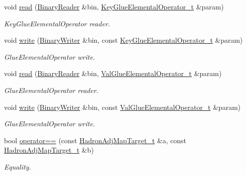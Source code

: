 \begin{DoxyCompactItemize}
void \mbox{\hyperlink{namespaceHadron_a008c27a4777be30324acc6271e059d2e}{read}} (\mbox{\hyperlink{classADATIO_1_1BinaryReader}{Binary\+Reader}} \&bin, \mbox{\hyperlink{structHadron_1_1KeyGlueElementalOperator__t}{Key\+Glue\+Elemental\+Operator\+\_\+t}} \&param)
\begin{DoxyCompactList}\small\item\em Key\+Glue\+Elemental\+Operator reader. \end{DoxyCompactList}\item 
void \mbox{\hyperlink{namespaceHadron_a91e2c5264aeab6dfb2be779cf7140626}{write}} (\mbox{\hyperlink{classADATIO_1_1BinaryWriter}{Binary\+Writer}} \&bin, const \mbox{\hyperlink{structHadron_1_1KeyGlueElementalOperator__t}{Key\+Glue\+Elemental\+Operator\+\_\+t}} \&param)
\begin{DoxyCompactList}\small\item\em Glue\+Elemental\+Operator write. \end{DoxyCompactList}\item 
void \mbox{\hyperlink{namespaceHadron_a9991ac06f4136479286a214307cd17dc}{read}} (\mbox{\hyperlink{classADATIO_1_1BinaryReader}{Binary\+Reader}} \&bin, \mbox{\hyperlink{structHadron_1_1ValGlueElementalOperator__t}{Val\+Glue\+Elemental\+Operator\+\_\+t}} \&param)
\begin{DoxyCompactList}\small\item\em Glue\+Elemental\+Operator reader. \end{DoxyCompactList}\item 
void \mbox{\hyperlink{namespaceHadron_aee7b5924c79af024abb8c3d99f7e8b34}{write}} (\mbox{\hyperlink{classADATIO_1_1BinaryWriter}{Binary\+Writer}} \&bin, const \mbox{\hyperlink{structHadron_1_1ValGlueElementalOperator__t}{Val\+Glue\+Elemental\+Operator\+\_\+t}} \&param)
\begin{DoxyCompactList}\small\item\em Glue\+Elemental\+Operator write. \end{DoxyCompactList}\item 
bool \mbox{\hyperlink{namespaceHadron_a89bb389d765cff67405fdb2d27b9b289}{operator==}} (const \mbox{\hyperlink{structHadron_1_1HadronAdjMapTarget__t}{Hadron\+Adj\+Map\+Target\+\_\+t}} \&a, const \mbox{\hyperlink{structHadron_1_1HadronAdjMapTarget__t}{Hadron\+Adj\+Map\+Target\+\_\+t}} \&b)
\begin{DoxyCompactList}\small\item\em Equality. \end{DoxyCompactList}\item 

\end{DoxyCompactItemize}
